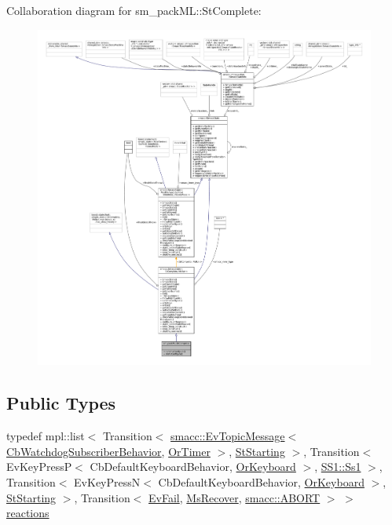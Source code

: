 Collaboration diagram for sm\+\_\+pack\+ML\+:\+:St\+Complete\+:
\nopagebreak
\begin{figure}[H]
\begin{center}
\leavevmode
\includegraphics[width=350pt]{structsm__packML_1_1StComplete__coll__graph}
\end{center}
\end{figure}
\subsection*{Public Types}
\begin{DoxyCompactItemize}
\item 
typedef mpl\+::list$<$ Transition$<$ \hyperlink{structsmacc_1_1default__events_1_1EvTopicMessage}{smacc\+::\+Ev\+Topic\+Message}$<$ \hyperlink{classsm__packML_1_1cl__subscriber_1_1CbWatchdogSubscriberBehavior}{Cb\+Watchdog\+Subscriber\+Behavior}, \hyperlink{classsm__packML_1_1OrTimer}{Or\+Timer} $>$, \hyperlink{structsm__packML_1_1StStarting}{St\+Starting} $>$, Transition$<$ Ev\+Key\+PressP$<$ Cb\+Default\+Keyboard\+Behavior, \hyperlink{classsm__packML_1_1OrKeyboard}{Or\+Keyboard} $>$, \hyperlink{structsm__packML_1_1SS1_1_1Ss1}{S\+S1\+::\+Ss1} $>$, Transition$<$ Ev\+Key\+PressN$<$ Cb\+Default\+Keyboard\+Behavior, \hyperlink{classsm__packML_1_1OrKeyboard}{Or\+Keyboard} $>$, \hyperlink{structsm__packML_1_1StStarting}{St\+Starting} $>$, Transition$<$ \hyperlink{structsm__packML_1_1EvFail}{Ev\+Fail}, \hyperlink{classsm__packML_1_1MsRecover}{Ms\+Recover}, \hyperlink{structsmacc_1_1default__transition__tags_1_1ABORT}{smacc\+::\+A\+B\+O\+RT} $>$ $>$ \hyperlink{structsm__packML_1_1StComplete_a02c15e2bdde49cb38eeba92881d47074}{reactions}
\end{DoxyCompactItemize}
